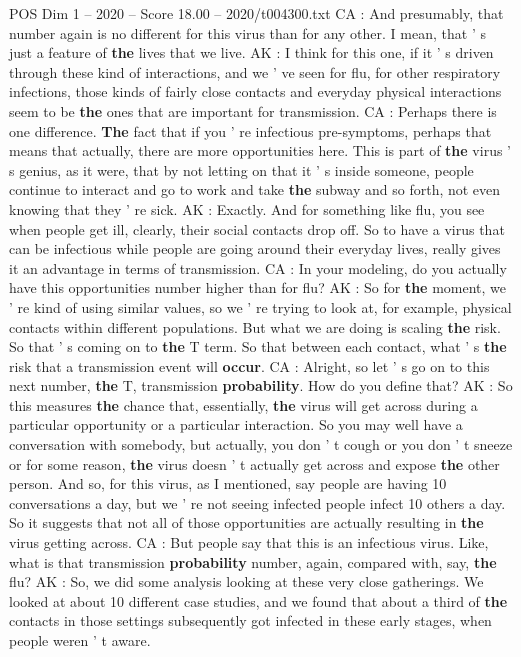 \begin{textsample}{POS Dim 1 – 2020 – Score 18.00 – 2020/t004300.txt}
CA : And presumably, that number again is no different for this virus than for any other.
I mean, that ' s just a feature of \textbf{the} lives that we live.
AK : I think for this one, if it ' s driven through these kind of interactions, and we ' ve seen for flu, for other respiratory infections, those kinds of fairly close contacts and everyday physical interactions seem to be \textbf{the} ones that are important for transmission.
CA : Perhaps there is one difference. \textbf{The} fact that if you ' re infectious pre-symptoms, perhaps that means that actually, there are more opportunities here.
This is part of \textbf{the} virus ' s genius, as it were, that by not letting on that it ' s inside someone, people continue to interact and go to work and take \textbf{the} subway and so forth, not even knowing that they ' re sick.
AK : Exactly.
And for something like flu, you see when people get ill, clearly, their social contacts drop off.
So to have a virus that can be infectious while people are going around their everyday lives, really gives it an advantage in terms of transmission.
CA : In your modeling, do you actually have this opportunities number higher than for flu?
AK : So for \textbf{the} moment, we ' re kind of using similar values, so we ' re trying to look at, for example, physical contacts within different populations.
But what we are doing is scaling \textbf{the} risk.
So that ' s coming on to \textbf{the} T term.
So that between each contact, what ' s \textbf{the} risk that a transmission event will \textbf{occur}.
CA : Alright, so let ' s go on to this next number, \textbf{the} T, transmission \textbf{probability}.
How do you define that?
AK : So this measures \textbf{the} chance that, essentially, \textbf{the} virus will get across during a particular opportunity or a particular interaction.
So you may well have a conversation with somebody, but actually, you don ' t cough or you don ' t sneeze or for some reason, \textbf{the} virus doesn ' t actually get across and expose \textbf{the} other person.
And so, for this virus, as I mentioned, say people are having 10 conversations a day, but we ' re not seeing infected people infect 10 others a day.
So it suggests that not all of those opportunities are actually resulting in \textbf{the} virus getting across.
CA : But people say that this is an infectious virus.
Like, what is that transmission \textbf{probability} number, again, compared with, say, \textbf{the} flu?
AK : So, we did some analysis looking at these very close gatherings.
We looked at about 10 different case studies, and we found that about a third of \textbf{the} contacts in those settings subsequently got infected in these early stages, when people weren ' t aware.

\end{textsample}
